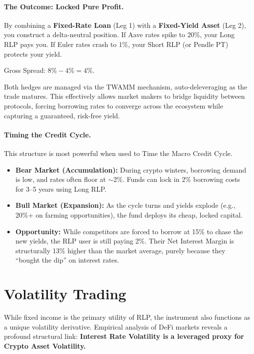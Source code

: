 \documentclass[12pt]{article}
\begin{document}
\paragraph{The Outcome: Locked Pure Profit.}
By combining a \textbf{Fixed-Rate Loan} (Leg 1) with a \textbf{Fixed-Yield Asset} (Leg 2), you construct a delta-neutral position. If Aave rates spike to 20\%, your Long RLP pays you. If Euler rates crash to 1\%, your Short RLP (or Pendle PT) protects your yield.

Gross Spread: $8\% - 4\% = 4\%$.

Both hedges are managed via the TWAMM mechanism, auto-deleveraging as the trade matures. This effectively allows market makers to bridge liquidity between protocols, forcing borrowing rates to converge across the ecosystem while capturing a guaranteed, risk-free yield.

\paragraph{Timing the Credit Cycle.}
This structure is most powerful when used to Time the Macro Credit Cycle.

\begin{itemize}
    \item \textbf{Bear Market (Accumulation):} During crypto winters, borrowing demand is low, and rates often floor at $\sim$2\%. Funds can lock in 2\% borrowing costs for 3--5 years using Long RLP.
    \item \textbf{Bull Market (Expansion):} As the cycle turns and yields explode (e.g., 20\%+ on farming opportunities), the fund deploys its cheap, locked capital.
    \item \textbf{Opportunity:} While competitors are forced to borrow at 15\% to chase the new yields, the RLP user is still paying 2\%. Their Net Interest Margin is structurally 13\% higher than the market average, purely because they ``bought the dip'' on interest rates.
\end{itemize}

\section{Volatility Trading}

While fixed income is the primary utility of RLP, the instrument also functions as a unique volatility derivative. Empirical analysis of DeFi markets reveals a profound structural link: \textbf{Interest Rate Volatility is a leveraged proxy for Crypto Asset Volatility.}
\end{document}
